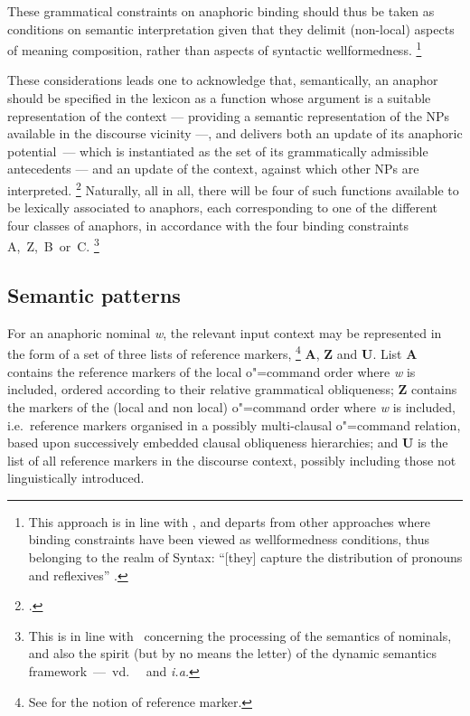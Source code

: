 \documentclass[output=paper
	        ,collection
	        ,collectionchapter
 	        ,biblatex
                ,babelshorthands
                ,newtxmath
                ,draftmode
                ,colorlinks, citecolor=brown
]{langscibook}
\begin{document}
These grammatical constraints on anaphoric binding should thus be taken as conditions on semantic interpretation
given that they delimit (non-local) aspects of meaning composition,
rather than aspects of syntactic wellformedness.%
%
\footnote{
This approach is in line with \citep{gawron:anaph90}, and departs from other approaches where binding constraints have been viewed as 
wellformedness conditions, thus belonging to the
realm of Syntax: ``[they] capture  the distribution of pronouns and reflexives''
\citep[]{rein:refl93}.}



These considerations leads one to acknowledge that, semantically, an anaphor 
should be specified in the lexicon as a function whose argument is
a suitable representation of the context --- providing a
semantic representation of the NPs available in the discourse vicinity ---, 
and delivers both an 
update of its anaphoric potential~--- which is instantiated as 
the set of its grammatically admissible antecedents --- and an update of the 
context, against which other NPs are interpreted.%
\footnote{
\citep{brancoDaarc:1998,brancoColing:2000,branco:2002a}.
}
Naturally, all in all, 
there will be four of
such functions available to be lexically associated to anaphors,
each corresponding to one of the different four classes of anaphors,
in accordance with the four binding constraints A,~Z,~B~or~C.%
%
\footnote{
This is in line with~\citep{johnson:disc90} concerning the 
processing of the semantics of nominals, and also 
the spirit (but by no means the letter) of the dynamic semantics framework~---~vd.~\ \citep{chi:dyn95} and \citep{stal:context98} {\em i.a.}
}

\subsection{Semantic patterns}\label{semanticPatterns}

For an anaphoric nominal {\em w}, the relevant input context may be represented
in the form of a set of  three lists of reference markers,%
\footnote{
See \citep{Karttunen1976, Kamp1981, Heim1982, Seuren1985, kamp:drt93} for the notion of reference marker.
}
{\bf A}, {\bf Z} and
{\bf U}.  List {\bf A} contains the reference markers of the local
\mbox{o"=command} order where {\it w} is included, ordered according to their relative grammatical
obliqueness; {\bf Z} contains  the markers of the (local and non local) \mbox{o"=command} order where {\it w}
is included, i.e.\ reference markers organised in a possibly multi-clausal o"=command relation, 
based upon successively embedded clausal obliqueness hierarchies;
and {\bf U} is the list
of all reference markers in the  discourse context, possibly including those not linguistically
introduced.
\end{document}
